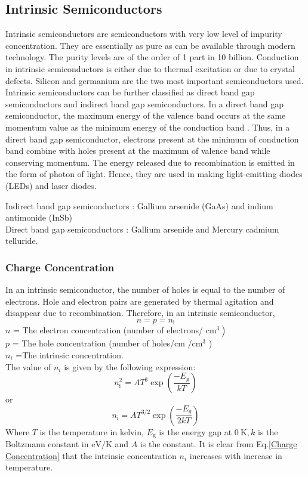 \subsection{Intrinsic Semiconductors}
Intrinsic semiconductors are semiconductors with very low level of impurity concentration. They are essentially as pure as can be available through modern technology. The purity levels are of the order of 1 part in 10 billion. Conduction in intrinsic semiconductors is either due to thermal excitation or due to crystal defects. Silicon and germanium are the two most important semiconductors used. \\
Intrinsic semiconductors can be further classified as direct band gap semiconductors and indirect band gap semiconductors. In a direct band gap semiconductor, the maximum energy of the valence band occurs at the same momentum value as the minimum energy of the conduction band . Thus, in a direct band gap semiconductor, electrons present at the minimum of conduction band combine with holes present at the maximum of valence band while conserving momentum. The energy released due to recombination is emitted in the form of photon of light. Hence, they are used in making light-emitting diodes (LEDs) and laser diodes. 
\begin{example}$\left. \right. $\\
Indirect band gap semiconductors : Gallium arsenide (GaAs) and indium antimonide (InSb)\\
Direct band gap semiconductors : Gallium arsenide and Mercury cadmium telluride.
\end{example}
\subsubsection{ Charge Concentration}
In an intrinsic semiconductor, the number of holes is equal to the number of electrons. Hole and electron pairs are generated by thermal agitation and disappear due to recombination. Therefore, in an intrinsic semiconductor,
\begin{equation}
n=p=n_{\mathrm{i}}
\end{equation}
$n$ = The electron concentration (number of electrons/ $\left.\mathrm{cm}^{3}\right)$\\
$ p$ = The hole concentration (number of holes/cm $/ \mathrm{cm}^{3}$ )\\
$n_{i}$ =The intrinsic concentration.\\
The value of $n_{i}$ is given by the following expression:
\begin{equation}
n_{\mathrm{i}}^{2}=A T^{3} \exp \left(\frac{-E_{\mathrm{g}}}{k T}\right)\label{Charge Concentration}
\end{equation}
or 
\begin{equation}
n_{\mathrm{i}}=AT^{3 / 2} \exp \left(\frac{-E_{g}}{2 k T}  \right)
\end{equation}
Where $T$ is the temperature in kelvin, $E_{\mathrm{g}}$ is the energy gap at $0 \mathrm{~K}, k$ is the Boltzmann constant in $\mathrm{eV} / \mathrm{K}$ and $A$ is the constant.
It is clear from Eq.\ref{Charge Concentration} that the intrinsic concentration $n_{i}$ increases with increase in temperature.
